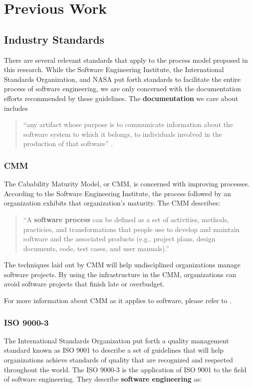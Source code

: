 \section{Previous Work}\label{previous}

\subsection{Industry Standards}
There are several relevant standards that apply to the process model proposed in
this research. While the Software Engineering Institute, the International
Standards Organization, and NASA put forth standards to facilitate the entire
process of software engineering, we are only concerned with the documentation
efforts recommended by these guidelines. The \textbf{documentation} we care
about includes 
\begin{quote}
``any artifact whose purpose is to communicate information about the software
system to which it belongs, to individuals involved in the production of that
software'' \cite{Forward2002}.
\end{quote}

\subsubsection{CMM}
The Cabability Maturity Model, or CMM, is concerned with improving processes.
According to the Software Engineering Institute, the process followed by an
organization exhibits that organization's maturity. The CMM describes:

\begin{quote}\label{process}
``A \textbf{software process} can be defined as a set of activities, methods,
practicies, and transformations that people use to develop and maintain software
and the associated products (e.g., project plans, design documents, code, test
cases, and user manuals).'' \cite{CMM11}
\end{quote}

The techniques laid out by CMM will help undisciplined organizations manage
software projects. By using the infrastructure in the CMM, organizations can 
avoid software projects that finish late or overbudget.

For more information about CMM as it applies to software, please refer to
\cite{CMM11}.

\subsubsection{ISO 9000-3}
The International Standards Organization put forth a quality management standard
known as ISO 9001 to describe a set of guidelines that will help organizations
achieve standards of quality that are recognized and respected throughout the
world. The ISO 9000-3 is the application of ISO 9001 to the field of software
engineering. They describe \textbf{software engineering} as: 

